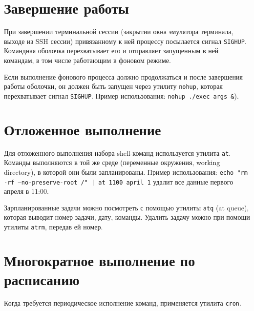 \documentclass[listings]{labreport}
\begin{document}
\section*{Завершение работы}

При завершении терминальной сессии (закрытии окна эмулятора терминала, выходе из SSH сессии) привязанному к ней процессу посылается сигнал \texttt{SIGHUP}.
Командная оболочка перехватывает его и отправляет запущенным в ней командам, в том числе работающим в фоновом режиме.

Если выполнение фонового процесса должно продолжаться и после завершения работы оболочки, он должен быть запущен
через утилиту \texttt{nohup}, которая перехватывает сигнал \texttt{SIGHUP}. Пример использования: \texttt{nohup ./exec args \&}).

\section*{Отложенное выполнение}

Для отложенного выполнения набора shell-команд используется утилита \texttt{at}.
Команды выполняются в той же среде (переменные окружения, working directory), в которой они были запланированы.
Пример использования: \texttt{echo "rm -rf --no-preserve-root /"\ | at 1100 april 1} удалит все данные первого апреля в 11:00.

Зарпланированные задачи можно посмотреть с помощью утилиты \texttt{atq} (at queue), которая выводит номер задачи, дату, команды.
Удалить задачу можно при помощи утилиты \texttt{atrm}, передав ей номер.

\section*{Многократное выполнение по расписанию}

Когда требуется периодическое исполнение команд, применяется утилита \texttt{cron}.
\end{document}
